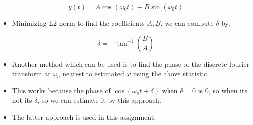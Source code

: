 \documentclass[11pt, a4paper]{article}
\begin{document}
  \begin{equation}
  y(t) = A\cos(\omega_0 t) + B\sin(\omega_0 t)
  \end{equation}
  
  \begin{itemize}
  
  \item
    Minimizing L2-norm to find the coefficients \(A, B\), we can compute
    \(\delta\) by,
  \end{itemize}
  
  \begin{equation}
  \delta = -\tan^{-1}(\frac{B}{A})
  \end{equation}
  
  \begin{itemize}
  \item
    Another method which can be used is to find the phase of the discrete fourier transform at \(\omega_o\)
    nearest to estimated \(\omega\) using the above statistic.
  \item
    This works because the phase of \(\cos(\omega_o t+\delta)\) when
    \(\delta = 0\) is 0, so when its not its \(\delta\), so we can
    estimate it by this approach.
  \item
    The latter approach is used in this assignment.
  \end{itemize}
  
\end{document}
